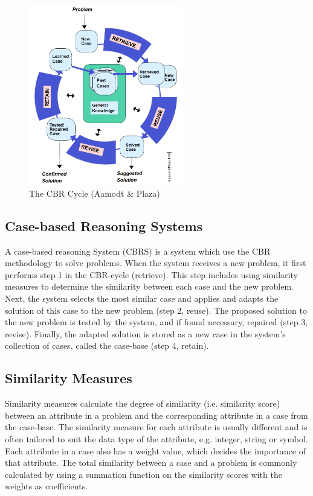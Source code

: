 \begin{figure}[h]
    \centering
    \includegraphics[width=0.6\textwidth]{fig/cbr-cycle.png}
    \caption[The CBR Cycle]{The CBR Cycle (Aamodt \& Plaza) \cite{aamodt1994case}}
    \label{fig:cbr_cycle}
\end{figure}

\subsection{Case-based Reasoning Systems}

A case-based reasoning System (CBRS) is a system which use the CBR methodology to solve problems. When the system receives a new problem, it first performs step 1 in the CBR-cycle (retrieve). This step includes using similarity measures to determine the similarity between each case and the new problem. Next, the system selects the most similar case and applies and adapts the solution of this case to the new problem (step 2, reuse). The proposed solution to the new problem is tested by the system, and if found necessary, repaired (step 3, revise). Finally, the adapted solution is stored as a new case in the system's collection of cases, called the case-base (step 4, retain).

\subsection{Similarity Measures}

Similarity measures calculate the degree of similarity (i.e. similarity score) between an attribute in a problem and the corresponding attribute in a case from the case-base. The similarity measure for each attribute is usually different and is often tailored to suit the data type of the attribute, e.g. integer, string or symbol. Each attribute in a case also has a weight value, which decides the importance of that attribute. The total similarity between a case and a problem is commonly calculated by using a summation function on the similarity scores with the weights as coefficients.


